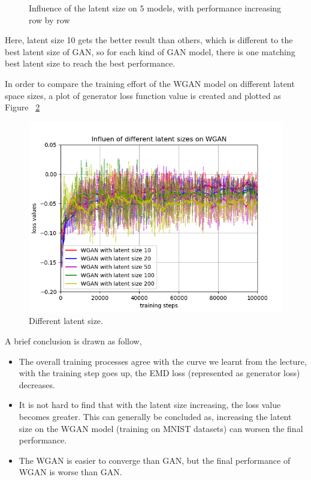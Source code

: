 \documentclass[12pt,letterpaper]{article}
\begin{document}
\begin{figure}[h]
    \hspace*{\fill}
    \caption{Influence of the latent size on $5$ models, with performance increasing row by row} \label{fig:MNIST_WGAN_latent}
\end{figure}

Here, latent size 10 gets the better result than others, which is different to the best latent size of GAN, so for each kind of GAN model, there is one matching best latent size to reach the best performance.

In order to compare the training effort of the WGAN model on different latent space sizes, a plot of generator loss function value is created and plotted as Figure ~\ref{fig:wgen_latent}
\begin{figure}[h]
    \centering
    \includegraphics[width=.6\linewidth]{WGAN_MNIST_latents.png}
    \caption{\small Different latent size.}
    \label{fig:wgen_latent}
\end{figure}



A brief conclusion is drawn as follow,
\begin{itemize}
    \item The overall training processes agree with the curve we learnt from the lecture, with the training step goes up, the EMD loss (represented as generator loss) decreases.
    \item It is not hard to find that with the latent size increasing, the loss value becomes greater. This can generally be concluded as, increasing the latent size on the WGAN model (training on MNIST datasets) can worsen the final performance.
    \item The WGAN is easier to converge than GAN, but the final performance of WGAN is worse than GAN. 
\end{itemize}
 
\end{document}
